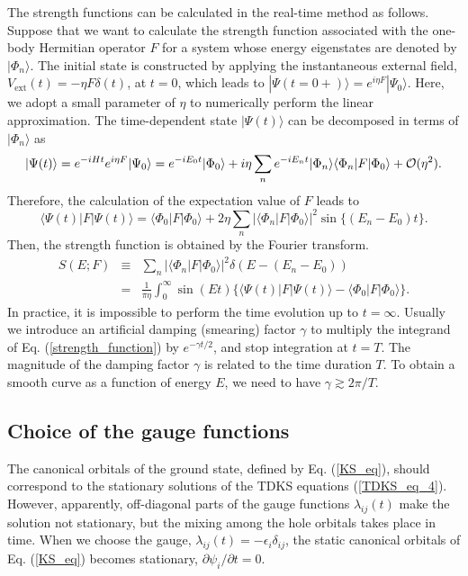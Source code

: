\documentclass[twoside]{article}
\newcommand{\bra}[1]{\langle {#1} |}
\newcommand{\ket}[1]{| {#1} \rangle}
\begin{document}
{The strength functions can be calculated in the real-time method
as follows.
Suppose that we want to calculate the strength function associated with
the one-body Hermitian operator $F$ for a system whose energy eigenstates
are denoted by $\ket{\Phi_n}$.
The initial state is constructed by applying the instantaneous
external field, $V_\textrm{ext}(t)=-\eta F \delta(t)$, at $t=0$,
which leads to $\ket{\Psi(t=0+)}=e^{i\eta{F}}\ket{\Psi_0}$.
Here, we adopt a small parameter of $\eta$ to numerically perform
the linear approximation.
The time-dependent state $\ket{\Psi(t)}$
can be decomposed in terms of $\ket{\Phi_n}$ as
\begin{equation}
\ket{\Psi(t)}=e^{-iHt}e^{i\eta F}\ket{\Psi_0}
= e^{-iE_0 t}\ket{\Phi_0} 
+ i\eta \sum_n e^{-iE_n t}\ket{\Phi_n}\bra{\Phi_n}F\ket{\Phi_0} 
+ {\cal O}(\eta^2) .
\end{equation}
Therefore, the calculation of the expectation value of $F$ leads to
\begin{equation}
\bra{\Psi(t)} F\ket{\Psi(t)} = \bra{\Phi_0} F \ket{\Phi_0}
+ 2\eta \sum_n |\bra{\Phi_n} F \ket{\Phi_0}|^2 \sin\{(E_n-E_0)t\}  .
\end{equation}
Then, the strength function is obtained by the Fourier transform.
\begin{eqnarray}
S(E;F) &\equiv& \sum_n 
|\bra{\Phi_n} F \ket{\Phi_0}|^2 \delta(E-(E_n-E_0)) \\
&=&
\frac{1}{\pi \eta} \int_0^\infty \sin(Et)
\{ \bra{\Psi(t)} F\ket{\Psi(t)} - \bra{\Phi_0} F \ket{\Phi_0} \} .
\label{strength_function}
\end{eqnarray}
In practice, it is impossible to perform the time evolution up to
$t=\infty$.
Usually we introduce an artificial damping (smearing) factor $\gamma$
to multiply the integrand of Eq. (\ref{strength_function}) by
$e^{-\gamma t/2}$, and stop integration at $t=T$.
The magnitude of the damping factor $\gamma$ is related to the
time duration $T$.
To obtain a smooth curve as a function of energy $E$,
we need to have $\gamma \gtrsim 2\pi/T$.


\subsection{Choice of the gauge functions}

The canonical orbitals of the ground state, defined by Eq. (\ref{KS_eq}),
should correspond to the stationary solutions of
the TDKS equations (\ref{TDKS_eq_4}).
However, apparently, off-diagonal parts of the gauge functions
$\lambda_{ij}(t)$ make
the solution not stationary, but the mixing among the hole orbitals
takes place in time.
When we choose the gauge,
$\lambda_{ij}(t)=-\epsilon_i\delta_{ij}$,
the static canonical orbitals of Eq. (\ref{KS_eq}) becomes stationary,
$\partial\psi_i/\partial t=0$.

}
\end{document}
